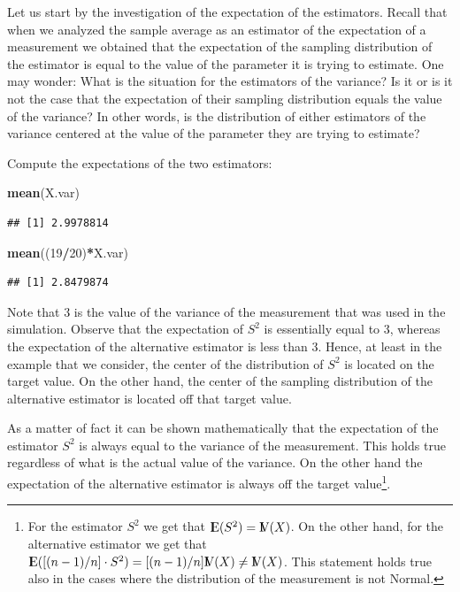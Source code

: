 \documentclass[]{krantz}
\makeatletter
\newenvironment{Shaded}{\begin{snugshade}}{\end{snugshade}}
\newcommand{\KeywordTok}[1]{\textcolor[rgb]{0.13,0.29,0.53}{\textbf{#1}}}
\newcommand{\DecValTok}[1]{\textcolor[rgb]{0.00,0.00,0.81}{#1}}
\newcommand{\OperatorTok}[1]{\textcolor[rgb]{0.81,0.36,0.00}{\textbf{#1}}}
\newcommand{\NormalTok}[1]{#1}
\newcommand{\Expec}{{\rm I\kern-.3em E}}
\newcommand{\Var}{{\rm I\kern-.3em V}}
\newenvironment{kframe}{%
\medskip{}
\setlength{\fboxsep}{.8em}
 \def\at@end@of@kframe{}%
 \ifinner\ifhmode%
  \def\at@end@of@kframe{\end{minipage}}%
  \begin{minipage}{\columnwidth}%
 \fi\fi%
 \def\FrameCommand##1{\hskip\@totalleftmargin \hskip-\fboxsep
 \colorbox{shadecolor}{##1}\hskip-\fboxsep
     \hskip-\linewidth \hskip-\@totalleftmargin \hskip\columnwidth}%
 \MakeFramed {\advance\hsize-\width
   \@totalleftmargin\z@ \linewidth\hsize
   \@setminipage}}%
 {\par\unskip\endMakeFramed%
 \at@end@of@kframe}
\renewenvironment{Shaded}{\begin{kframe}}{\end{kframe}}
\theoremstyle{definition}
\theoremstyle{definition}
\theoremstyle{definition}
\theoremstyle{remark}
\makeatother
\begin{document}
Let us start by the investigation of the expectation of the estimators.
Recall that when we analyzed the sample average as an estimator of the
expectation of a measurement we obtained that the expectation of the
sampling distribution of the estimator is equal to the value of the
parameter it is trying to estimate. One may wonder: What is the
situation for the estimators of the variance? Is it or is it not the
case that the expectation of their sampling distribution equals the
value of the variance? In other words, is the distribution of either
estimators of the variance centered at the value of the parameter they
are trying to estimate?

Compute the expectations of the two estimators:

\begin{Shaded}
\begin{Highlighting}[]
\KeywordTok{mean}\NormalTok{(X.var)}
\end{Highlighting}
\end{Shaded}

\begin{verbatim}
## [1] 2.9978814
\end{verbatim}

\begin{Shaded}
\begin{Highlighting}[]
\KeywordTok{mean}\NormalTok{((}\DecValTok{19}\OperatorTok{/}\DecValTok{20}\NormalTok{)}\OperatorTok{*}\NormalTok{X.var)}
\end{Highlighting}
\end{Shaded}

\begin{verbatim}
## [1] 2.8479874
\end{verbatim}

Note that 3 is the value of the variance of the measurement that was
used in the simulation. Observe that the expectation of \(S^2\) is
essentially equal to 3, whereas the expectation of the alternative
estimator is less than 3. Hence, at least in the example that we
consider, the center of the distribution of \(S^2\) is located on the
target value. On the other hand, the center of the sampling distribution
of the alternative estimator is located off that target value.

As a matter of fact it can be shown mathematically that the expectation
of the estimator \(S^2\) is always equal to the variance of the
measurement. This holds true regardless of what is the actual value of
the variance. On the other hand the expectation of the alternative
estimator is always off the target value\footnote{For the estimator
  \(S^2\) we get that \(\Expec(S^2) = \Var(X)\). On the other hand, for
  the alternative estimator we get that
  \(\Expec([(n-1)/n]\cdot S^2) = [(n-1)/n]\Var(X) \not = \Var(X)\). This
  statement holds true also in the cases where the distribution of the
  measurement is not Normal.}.
\end{document}

